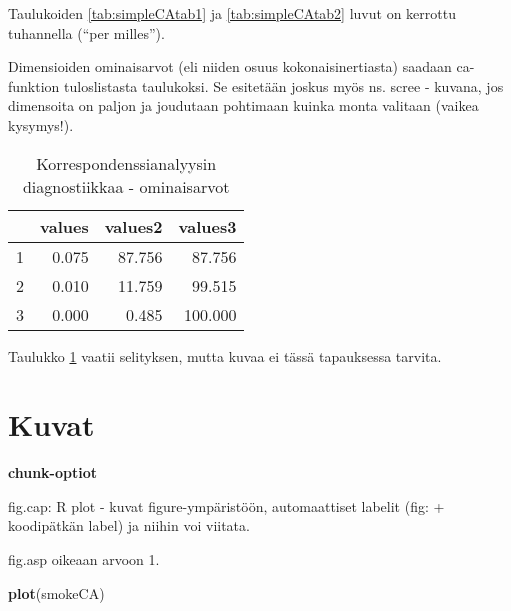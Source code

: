 \documentclass[finnish,]{book}
\newenvironment{Shaded}{\begin{snugshade}}{\end{snugshade}}
\newcommand{\DataTypeTok}[1]{\textcolor[rgb]{0.13,0.29,0.53}{#1}}
\newcommand{\DecValTok}[1]{\textcolor[rgb]{0.00,0.00,0.81}{#1}}
\newcommand{\KeywordTok}[1]{\textcolor[rgb]{0.13,0.29,0.53}{\textbf{#1}}}
\newcommand{\NormalTok}[1]{#1}
\newcommand{\OperatorTok}[1]{\textcolor[rgb]{0.81,0.36,0.00}{\textbf{#1}}}
\newcommand{\OtherTok}[1]{\textcolor[rgb]{0.56,0.35,0.01}{#1}}
\newcommand{\StringTok}[1]{\textcolor[rgb]{0.31,0.60,0.02}{#1}}
\theoremstyle{definition}
\theoremstyle{definition}
\theoremstyle{definition}
\theoremstyle{remark}
\begin{document}
Taulukoiden \ref{tab:simpleCAtab1} ja \ref{tab:simpleCAtab2} luvut on
kerrottu tuhannella (``per milles'').

Dimensioiden ominaisarvot (eli niiden osuus kokonaisinertiasta) saadaan
ca-funktion tuloslistasta taulukoksi. Se esitetään joskus myös ns. scree
- kuvana, jos dimensoita on paljon ja joudutaan pohtimaan kuinka monta
valitaan (vaikea kysymys!).

\begin{Shaded}
\end{Shaded}

\begin{table}

\caption{\label{tab:simpleCAscree}Korrespondenssianalyysin diagnostiikkaa - ominaisarvot}
\centering
\begin{tabular}[t]{rrrr}
\toprule
 & values & values2 & values3\\
\midrule
1 & 0.075 & 87.756 & 87.756\\
2 & 0.010 & 11.759 & 99.515\\
3 & 0.000 & 0.485 & 100.000\\
\bottomrule
\end{tabular}
\end{table}

Taulukko \ref{tab:simpleCAscree} vaatii selityksen, mutta kuvaa ei tässä
tapauksessa tarvita.

\hypertarget{kuvat}{%
\section{Kuvat}\label{kuvat}}

\textbf{chunk-optiot}

fig.cap: R plot - kuvat figure-ympäristöön, automaattiset labelit (fig:
+ koodipätkän label) ja niihin voi viitata.

fig.asp oikeaan arvoon 1.

\begin{Shaded}
\begin{Highlighting}[]
\KeywordTok{plot}\NormalTok{(smokeCA)}
\end{Highlighting}
\end{Shaded}
\end{document}
